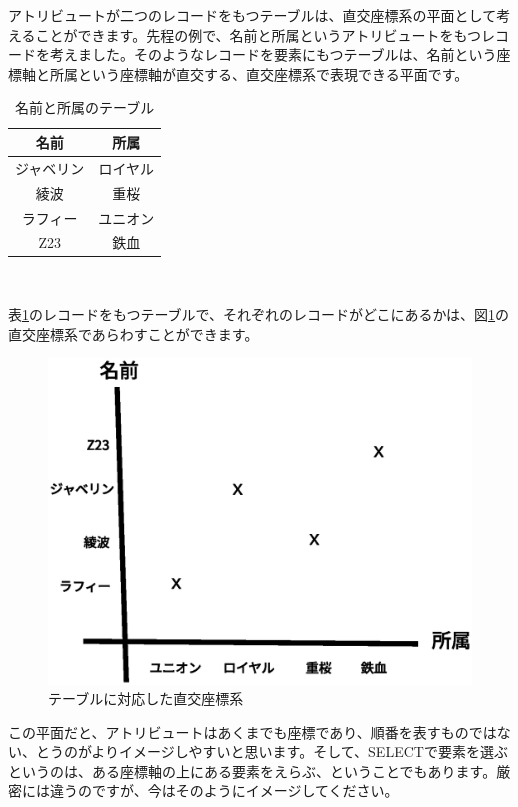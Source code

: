 アトリビュートが二つのレコードをもつテーブルは、直交座標系の平面として考えることができます。先程の例で、名前と所属というアトリビュートをもつレコードを考えました。そのようなレコードを要素にもつテーブルは、名前という座標軸と所属という座標軸が直交する、直交座標系で表現できる平面です。

\begin{table}[htb]
  \begin{tabular}{|c|c|} \hline
    名前 & 所属 \\ \hline
    ジャベリン & ロイヤル \\
    綾波 & 重桜 \\
    ラフィー & ユニオン \\
    Z23 & 鉄血 \\ \hline
  \end{tabular}
　　\label{table:names_belongs}
　　\caption{名前と所属のテーブル}
\end{table}

表\ref{table:names_belongs}のレコードをもつテーブルで、それぞれのレコードがどこにあるかは、図\ref{fig:2daxis}の直交座標系であらわすことができます。

\begin{figure}[htbp]
	\includegraphics[width=12cm,clip]{draw/2daxis.eps}
	\caption{テーブルに対応した直交座標系}
	\label{fig:2daxis}
\end{figure}


この平面だと、アトリビュートはあくまでも座標であり、順番を表すものではない、とうのがよりイメージしやすいと思います。そして、SELECTで要素を選ぶというのは、ある座標軸の上にある要素をえらぶ、ということでもあります。厳密には違うのですが、今はそのようにイメージしてください。

